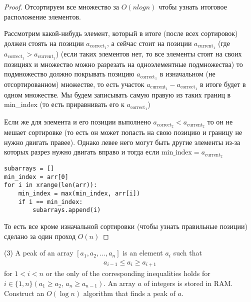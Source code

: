 \begin{proof}
Отсортируем все множество за $O(n log n)$ чтобы узнать итоговое расположение элементов.

Рассмотрим какой-нибудь элемент, который в итоге (после всех сортировок) должен стоять на позиции $a_{\text{correct}_1}$, а сейчас стоит на позиции $a_{\text{current}_1}$ (где $a_{\text{correct}_1} > a_{\text{current}_1}$) (если таких элементов нет, то все элементы стоят на своих позициях и множество можно разрезать на одноэлементные подмножества) то подмножество должно покрывать позицию $a_{\text{correct}_1}$ в изначальном (не отсортированном) множестве, то есть участок $a_{\text{current}_1}-a_{\text{correct}_1}$ в итоге будет в одном множестве. Мы будем записывать самую правую из таких границ в min_index (то есть приравнивать его к $a_{\text{correct}_1}$)

Если же для элемента и его позиции выполнено $a_{\text{correct}_2} < a_{\text{current}_2}$ то он не мешает сортировке (то есть он может попасть на свою позицию и границу не нужно двигать правее). Однако левее него могут быть другие элементы из-за которых разрез нужно двигать вправо и тогда если $\text{min_index} = a_{\text{current}_2}$

\begin{verbatim}
subarrays = []
min_index = arr[0]
for i in xrange(len(arr)):
    min_index = max(min_index, arr[i])
    if i == min_index:
        subarrays.append(i)
\end{verbatim}

То есть все кроме изначальной сортировки (чтобы узнать правильные позиции) сделано за один проход $O(n)$
\end{proof}
\vskip 0.4in




\begin{prob}
(3) A peak of an array $\left[a_1, a_2, \ldots, a_n\right]$ is an element $a_i$ such that
\begin{gather*}
    a_{i-1} \leqslant a_i \geqslant a_{i+1}
\end{gather*}
for $1<i<n$ or the only of the corresponding inequalities holds for $i \in\{1, n\}\left(a_1 \geqslant a_2\right.$, $\left.a_n \geqslant a_{n-1}\right)$. An array $a$ of integers is stored in RAM. Construct an $O(\log n)$ algorithm that finds a peak of $a$.
\end{prob}

